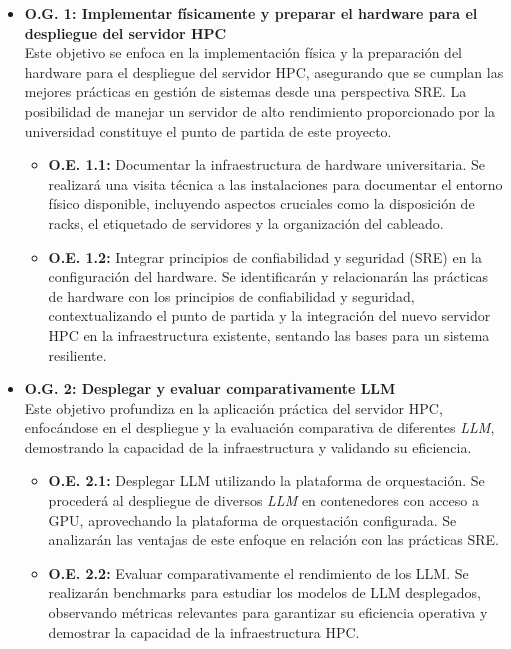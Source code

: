 \begin{itemize}
    \item \textbf{O.G. 1: Implementar físicamente y preparar el hardware para el despliegue del servidor HPC}\\
    Este objetivo se enfoca en la implementación física y la preparación del hardware para el despliegue del servidor HPC, asegurando que se cumplan las mejores prácticas en gestión de sistemas desde una perspectiva SRE. La posibilidad de manejar un servidor de alto rendimiento proporcionado por la universidad constituye el punto de partida de este proyecto.
    \begin{itemize}
        \item \textbf{O.E. 1.1:} Documentar la infraestructura de hardware universitaria. Se realizará una visita técnica a las instalaciones para documentar el entorno físico disponible, incluyendo aspectos cruciales como la disposición de racks, el etiquetado de servidores y la organización del cableado.
        \item \textbf{O.E. 1.2:} Integrar principios de confiabilidad y seguridad (SRE) en la configuración del hardware. Se identificarán y relacionarán las prácticas de hardware con los principios de confiabilidad y seguridad, contextualizando el punto de partida y la integración del nuevo servidor HPC en la infraestructura existente, sentando las bases para un sistema resiliente.
    \end{itemize}
    \item \textbf{O.G. 2: Desplegar y evaluar comparativamente LLM}\\
    Este objetivo profundiza en la aplicación práctica del servidor HPC, enfocándose en el despliegue y la evaluación comparativa de diferentes \textit{LLM}, demostrando la capacidad de la infraestructura y validando su eficiencia.
    \begin{itemize}
        \item \textbf{O.E. 2.1:} Desplegar LLM utilizando la plataforma de orquestación. Se procederá al despliegue de diversos \textit{LLM} en contenedores con acceso a GPU, aprovechando la plataforma de orquestación configurada. Se analizarán las ventajas de este enfoque en relación con las prácticas SRE.
        \item \textbf{O.E. 2.2:} Evaluar comparativamente el rendimiento de los LLM. Se realizarán benchmarks para estudiar los modelos de LLM desplegados, observando métricas relevantes para garantizar su eficiencia operativa y demostrar la capacidad de la infraestructura HPC.

\end{itemize}
\end{itemize}
